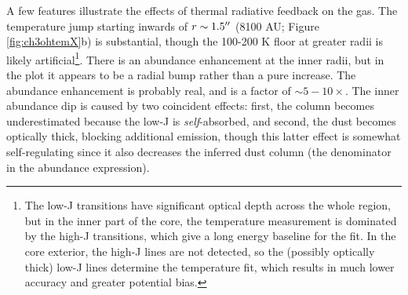 \documentclass[twocolumn]{aastex61}
\begin{document}
A few features illustrate the effects of thermal radiative feedback on the gas.
The temperature jump starting inwards of  $r\sim1.5\mbox{$^{\prime\prime}$}$ (8100 AU; Figure
\ref{fig:ch3ohtemX}b) is
substantial, though the 100-200 K floor at greater radii is likely
artificial\footnote{The low-J transitions have significant optical depth
across the whole region, but in the inner part of the core, the temperature
measurement is dominated by the high-J transitions, which give a long
energy baseline for the fit.  In the core exterior, the high-J lines are
not detected, so the (possibly optically thick) low-J lines determine
the temperature fit, which results in much lower accuracy and greater
potential bias.}.
There is an abundance enhancement at the inner radii, but in the plot it
appears to be a radial bump rather than a pure increase.  The abundance
enhancement is probably real,
and is a factor of $\sim5-10\times$.  The inner abundance dip
is caused by two coincident effects: first, the \methanol column becomes underestimated
because the low-J \methanol is \emph{self}-absorbed, and second, the dust
becomes optically thick, blocking additional \methanol emission, though this
latter effect is somewhat self-regulating since it also decreases the inferred
dust column (the denominator in the abundance expression).
\end{document}
